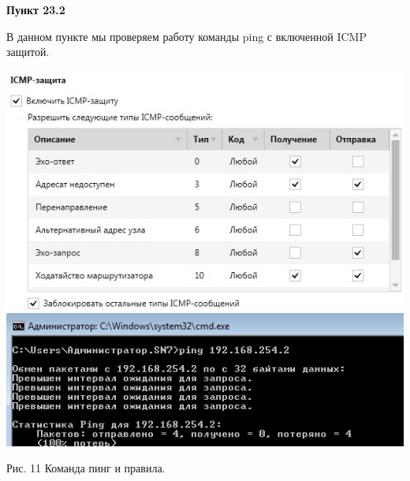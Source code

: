 \documentclass[a4paper,14pt]{extarticle}
\begin{document}
    \textbf{Пункт 23.2}
    \vspace{-3ex}
    \begin{center}
        \singlespacing
        В данном пункте мы проверяем работу команды ping с включенной ICMP защитой.

        \includegraphics[scale=0.45]{pics/23.2_1.jpg}
        \includegraphics[scale=0.45]{pics/23.2_2.jpg}

        Рис. 11 Команда пинг и правила.
    \end{center}
\end{document}
